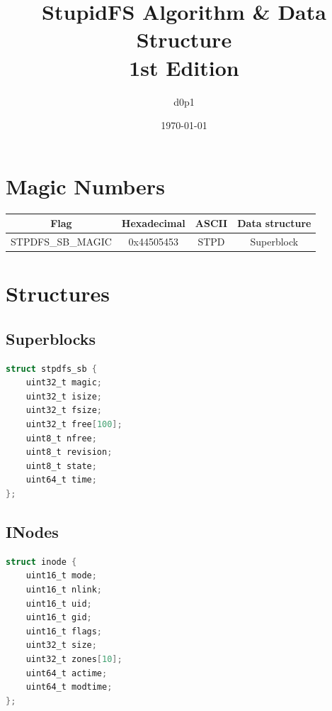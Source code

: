 \documentclass[a4paper, 12pt, openright, english]{scrbook}
\date{\today}
\title{%
	StupidFS Algorithm \& Data Structure \\
	\large 1st Edition}
\author{d0p1}
\begin{document}
	\frontmatter
	
	\maketitle
	\tableofcontents

	\mainmatter

	\chapter{Magic Numbers}

	\begin{center}
		\begin{tabular}{ |c|c|c|c| } 
 			\hline
 			\textbf{Flag} & \textbf{Hexadecimal} & \textbf{ASCII} & \textbf{Data structure}  \\ 
			\hline
 			STPDFS\_SB\_MAGIC & 0x44505453 & STPD & Superblock \\ 
 			\hline
		\end{tabular}
	\end{center}

	\chapter{Structures}

	\section{Superblocks}

	\begin{lstlisting}[language=C]
struct stpdfs_sb {
	uint32_t magic;
	uint32_t isize;
	uint32_t fsize;
	uint32_t free[100];
	uint8_t nfree;
	uint8_t revision;
	uint8_t state;
	uint64_t time;
};
	\end{lstlisting}

	\section{INodes}

	\begin{lstlisting}[language=C]
struct inode {
	uint16_t mode;
	uint16_t nlink;
	uint16_t uid;
	uint16_t gid;
	uint16_t flags;
	uint32_t size;
	uint32_t zones[10];
	uint64_t actime;
	uint64_t modtime;
};
	\end{lstlisting}
	\appendix
\end{document}
